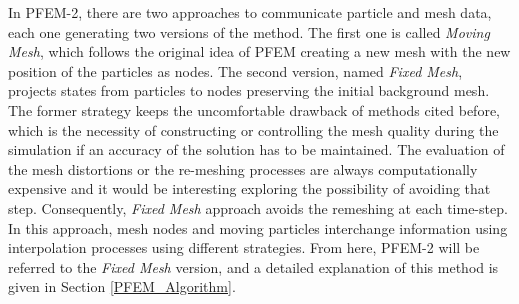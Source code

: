In PFEM-2, there are two approaches to communicate particle and mesh data, each one generating two versions of the method. The first one is called \textit{Moving Mesh}, which follows the original idea of PFEM creating a new mesh with the new position of the particles as nodes. The second version, named \textit{Fixed Mesh}, projects states from particles to nodes preserving the initial background mesh. The former strategy keeps the uncomfortable drawback of methods cited before, which is the necessity of constructing or controlling the mesh quality during the simulation if an accuracy of the solution has to be maintained. The evaluation of the mesh distortions or the re-meshing processes are always computationally expensive and it would be interesting exploring the possibility of avoiding that step. Consequently, \textit{Fixed Mesh} approach avoids the remeshing at each time-step. In this approach, mesh nodes and moving particles interchange information using interpolation processes using different strategies. From here, PFEM-2 will be referred to the \textit{Fixed Mesh} version, and a detailed explanation of this method is given in Section \ref{PFEM_Algorithm}. 


